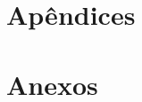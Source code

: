 \documentclass[fontsize=12pt,open=any,DIV=12,  BCOR=0mm,  headings=normal,   a4paper,pagesize=auto,toc=listof,twoside=false,chapterprefix=false,appendixprefix=true]{scrbook}
\begin{document}
\part{Apêndices}
\renewcommand{\chapapp}{Apêndice}
\renewcommand{\thechapter}{\Alph{chapter}}
\setcounter{chapter}{0}


  
\part{Anexos}
\renewcommand{\chapapp}{Anexo}
\renewcommand{\thechapter}{\Alph{chapter}}
\setcounter{chapter}{0}





%
\end{document}
